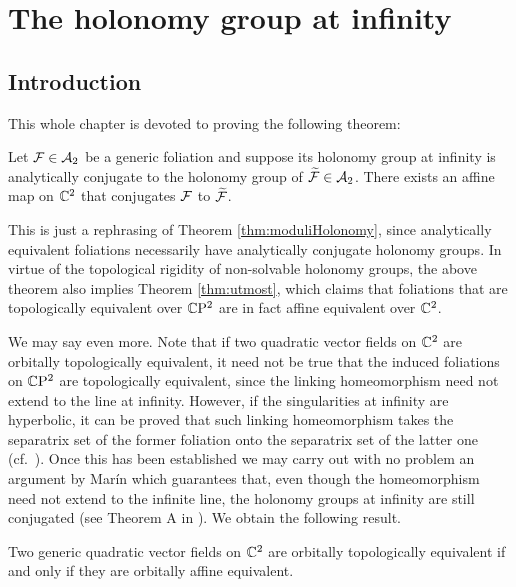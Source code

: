 \documentclass[phd,tocprelim]{cornell}
\begin{document}
\chapter{The holonomy group at infinity}\label{chpt:holonomy}

\section{Introduction}\label{sec:intro}

This whole chapter is devoted to proving the following theorem:

\begin{theorem}\label{thm:main}
Let $\F\in\A_2$ be a generic foliation and suppose its holonomy group at infinity is analytically conjugate to the holonomy group of $\Ft\in\A_2$. There exists an affine map on $\C^2$ that conjugates $\F$ to $\Ft$. 
\end{theorem}

This is just a rephrasing of Theorem \ref{thm:moduliHolonomy}, since analytically equivalent foliations necessarily have analytically conjugate holonomy groups. In virtue of the topological rigidity of non-solvable holonomy groups, the above theorem also implies Theorem \ref{thm:utmost}, which claims that foliations that are topologically equivalent over $\P^2$ are in fact affine equivalent over $\C^2$.

We may say even more. Note that if two quadratic vector fields on $\C^2$ are orbitally topologically equivalent, it need not be true that the induced foliations on $\P^2$ are topologically equivalent, since the linking homeomorphism need not extend to the line at infinity. However, if the singularities at infinity are hyperbolic, it can be proved that such linking homeomorphism takes the separatrix set of the former foliation onto the separatrix set of the latter one (cf.~\cite{TeymuriMafraScardua2013}). Once this has been established we may carry out with no problem an argument by Mar\'{i}n which guarantees that, even though the homeomorphism need not extend to the infinite line, the holonomy groups at infinity are still conjugated (see Theorem A in \cite{Marin2003}). We obtain the following result.

\begin{corollary}\label{coro:qvfs}
Two generic quadratic vector fields on $\C^2$ are orbitally topologically equivalent if and only if they are orbitally affine equivalent.
\end{corollary}
\end{document}
